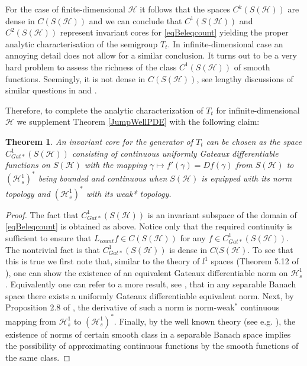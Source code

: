 \documentclass[12pt]{article}
\def\HC{\mathcal{H}}
\def\ga{\gamma}
\newtheorem{theorem}{Theorem}[section]
\begin{document}
For the case of finite-dimensional $\HC$ it follows that the spaces $C^k(S(\HC))$
are dense in $C(S(\HC))$ and we can conclude that $C^1(S(\HC))$ and $C^2(S(\HC))$ represent invariant
cores for \eqref{eqBeleqcount} yielding the proper analytic characterisation of the semigroup $T_t$.
In infinite-dimensional case an annoying detail does not allow for a similar conclusion.
It turns out to be a very hard problem to assess the richness of the class $C^1(S(\HC))$ of smooth functions.
Seemingly, it is not dense in $C(S(\HC))$, see lengthy discussions of similar questions in
\cite{Toolbox} and \cite{Phelps}.

Therefore, to complete the analytic characterization of  $T_t$ for infinite-dimensional $\HC$
we supplement Theorem \ref{JumpWellPDE} with the following claim:

\begin{theorem}
\label{JumpWellPDE1}
An invariant core for the generator of $T_t$ can be chosen as the space
$C^1_{Gat*}(S(\HC))$ consisting of continuous uniformly Gateaux differentiable functions on $S(\HC)$
with the mapping $\ga\mapsto f'(\ga)=Df(\ga)$
from $S(\HC)$ to $(\HC^1_s)^*$ being bounded and continuous
when $S(\HC)$ is equipped with its norm topology
and $(\HC^1_s)^*$ with its weak* topology.
\end{theorem}

\begin{proof}
The fact that $C^1_{Gat*}(S(\HC))$ is an invariant subspace of the domain of \eqref{eqBeleqcount}
is obtained as above. Notice only that the required continuity is sufficient to ensure that
$L_{count}f \in C(S(\HC))$ for any $f\in C^1_{Gat*}(S(\HC))$. The nontrivial fact is that
$C^1_{Gat*}(S(\HC))$ is dense in $C(S(\HC)$. To see that this is true we first note that,
similar to the theory of $l^1$ spaces (Theorem 5.12 of \cite{Phelps}), one can show the existence
of an equivalent Gateaux differentiable norm on $\HC^1_s$. Equivalently one can refer to a more
result, see \cite{Hayek}, that in any separable Banach space there exists a uniformly
Gateaux differentiable equivalent norm.
Next, by Proposition 2.8 of \cite{Phelps}, the derivative of such a norm is norm-weak${}^*$
continuous mapping from $\HC^1_s$ to $(\HC^1_s)^*$. Finally, by the well known theory
(see e.g. \cite{Eells}), the existence of norms of certain smooth class in a separable
Banach space implies the possibility of approximating continuous functions by the
smooth functions of the same class.
\end{proof}
\end{document}
